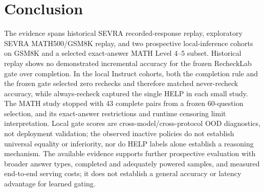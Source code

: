 \documentclass[conference]{IEEEtran}
\begin{document}
\section{Conclusion}
The evidence spans historical SEVRA recorded-response replay, exploratory SEVRA MATH500/GSM8K replay, and two prospective local-inference cohorts on GSM8K and a selected exact-answer MATH Level 4--5 subset. Historical replay shows no demonstrated incremental accuracy for the frozen RecheckLab gate over completion. In the local Instruct cohorts, both the completion rule and the frozen gate selected zero rechecks and therefore matched never-recheck accuracy, while always-recheck captured the single HELP in each small study. The MATH study stopped with 43 complete pairs from a frozen 60-question selection, and its exact-answer restrictions and runtime censoring limit interpretation. Local gate scores are cross-model/cross-protocol OOD diagnostics, not deployment validation; the observed inactive policies do not establish universal equality or inferiority, nor do HELP labels alone establish a reasoning mechanism. The available evidence supports further prospective evaluation with broader answer types, completed and adequately powered samples, and measured end-to-end serving costs; it does not establish a general accuracy or latency advantage for learned gating.


\balance

\end{document}
